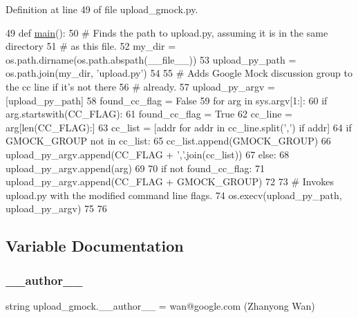 Definition at line 49 of file upload\+\_\+gmock.\+py.


\begin{DoxyCode}
49 \textcolor{keyword}{def }\hyperlink{namespaceupload__gmock_aea9cb062f9294622c32e54eb937f588e}{main}():
50   \textcolor{comment}{# Finds the path to upload.py, assuming it is in the same directory}
51   \textcolor{comment}{# as this file.}
52   my\_dir = os.path.dirname(os.path.abspath(\_\_file\_\_))
53   upload\_py\_path = os.path.join(my\_dir, \textcolor{stringliteral}{'upload.py'})
54 
55   \textcolor{comment}{# Adds Google Mock discussion group to the cc line if it's not there}
56   \textcolor{comment}{# already.}
57   upload\_py\_argv = [upload\_py\_path]
58   found\_cc\_flag = \textcolor{keyword}{False}
59   \textcolor{keywordflow}{for} arg \textcolor{keywordflow}{in} sys.argv[1:]:
60     \textcolor{keywordflow}{if} arg.startswith(CC\_FLAG):
61       found\_cc\_flag = \textcolor{keyword}{True}
62       cc\_line = arg[len(CC\_FLAG):]
63       cc\_list = [addr \textcolor{keywordflow}{for} addr \textcolor{keywordflow}{in} cc\_line.split(\textcolor{stringliteral}{','}) \textcolor{keywordflow}{if} addr]
64       \textcolor{keywordflow}{if} GMOCK\_GROUP \textcolor{keywordflow}{not} \textcolor{keywordflow}{in} cc\_list:
65         cc\_list.append(GMOCK\_GROUP)
66       upload\_py\_argv.append(CC\_FLAG + \textcolor{stringliteral}{','}.join(cc\_list))
67     \textcolor{keywordflow}{else}:
68       upload\_py\_argv.append(arg)
69 
70   \textcolor{keywordflow}{if} \textcolor{keywordflow}{not} found\_cc\_flag:
71     upload\_py\_argv.append(CC\_FLAG + GMOCK\_GROUP)
72 
73   \textcolor{comment}{# Invokes upload.py with the modified command line flags.}
74   os.execv(upload\_py\_path, upload\_py\_argv)
75 
76 
\end{DoxyCode}


\subsection{Variable Documentation}
\mbox{\label{namespaceupload__gmock_a56f523bfe887b27722a3ea662b4d88d7}} 
\subsubsection{\texorpdfstring{\+\_\+\+\_\+author\+\_\+\+\_\+}{\_\_author\_\_}}
{\footnotesize\ttfamily string upload\+\_\+gmock.\+\_\+\+\_\+author\+\_\+\+\_\+ = \textquotesingle{}wan@google.\+com (Zhanyong Wan)\textquotesingle{}\hspace{0.3cm}{\ttfamily [private]}}



